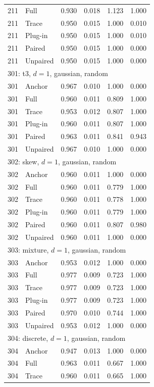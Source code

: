 \begin{longtable}{llrrrr}
211 & Full & 0.930 & 0.018 & 1.123 & 1.000 \\
211 & Trace & 0.950 & 0.015 & 1.000 & 0.010 \\
211 & Plug-in & 0.950 & 0.015 & 1.000 & 0.010 \\
211 & Paired & 0.950 & 0.015 & 1.000 & 0.000 \\
211 & Unpaired & 0.950 & 0.015 & 1.000 & 0.000 \\
\multicolumn{6}{l}{301: t3, $d=1$, gaussian, random}\\
301 & Anchor & 0.967 & 0.010 & 1.000 & 0.000 \\
301 & Full & 0.960 & 0.011 & 0.809 & 1.000 \\
301 & Trace & 0.953 & 0.012 & 0.807 & 1.000 \\
301 & Plug-in & 0.960 & 0.011 & 0.807 & 1.000 \\
301 & Paired & 0.963 & 0.011 & 0.841 & 0.943 \\
301 & Unpaired & 0.967 & 0.010 & 1.000 & 0.000 \\
\multicolumn{6}{l}{302: skew, $d=1$, gaussian, random}\\
302 & Anchor & 0.960 & 0.011 & 1.000 & 0.000 \\
302 & Full & 0.960 & 0.011 & 0.779 & 1.000 \\
302 & Trace & 0.960 & 0.011 & 0.778 & 1.000 \\
302 & Plug-in & 0.960 & 0.011 & 0.779 & 1.000 \\
302 & Paired & 0.960 & 0.011 & 0.807 & 0.980 \\
302 & Unpaired & 0.960 & 0.011 & 1.000 & 0.000 \\
\multicolumn{6}{l}{303: mixture, $d=1$, gaussian, random}\\
303 & Anchor & 0.953 & 0.012 & 1.000 & 0.000 \\
303 & Full & 0.977 & 0.009 & 0.723 & 1.000 \\
303 & Trace & 0.977 & 0.009 & 0.723 & 1.000 \\
303 & Plug-in & 0.977 & 0.009 & 0.723 & 1.000 \\
303 & Paired & 0.970 & 0.010 & 0.744 & 1.000 \\
303 & Unpaired & 0.953 & 0.012 & 1.000 & 0.000 \\
\multicolumn{6}{l}{304: discrete, $d=1$, gaussian, random}\\
304 & Anchor & 0.947 & 0.013 & 1.000 & 0.000 \\
304 & Full & 0.963 & 0.011 & 0.667 & 1.000 \\
304 & Trace & 0.960 & 0.011 & 0.665 & 1.000 \\

\end{longtable}
